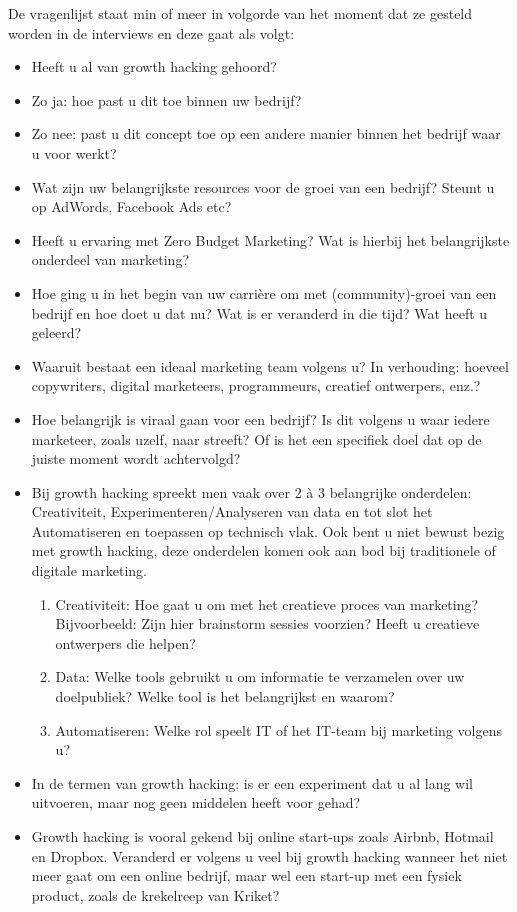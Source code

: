 De vragenlijst staat min of meer in volgorde van het moment dat ze gesteld worden in de interviews en deze gaat als volgt:
\begin{itemize} 
	\item Heeft u al van growth hacking gehoord?
	\item Zo ja: hoe past u dit toe binnen uw bedrijf?
	\item Zo nee: past u dit concept toe op een andere manier binnen het bedrijf waar u voor werkt?
	\item Wat zijn uw belangrijkste resources voor de groei van een bedrijf? Steunt u op AdWords, Facebook Ads etc?
	\item Heeft u ervaring met Zero Budget Marketing? Wat is hierbij het belangrijkste onderdeel van marketing?
	\item Hoe ging u in het begin van uw carrière om met (community)-groei van een bedrijf en hoe doet u dat nu? Wat is er veranderd in die tijd? Wat heeft u geleerd?
	\item Waaruit bestaat een ideaal marketing team volgens u? In verhouding: hoeveel copywriters, digital marketeers, programmeurs, creatief ontwerpers, enz.?
	\item Hoe belangrijk is viraal gaan voor een bedrijf? Is dit volgens u waar iedere marketeer, zoals uzelf, naar streeft? Of is het een specifiek doel dat op de juiste moment wordt achtervolgd?
	\item Bij growth hacking spreekt men vaak over 2 à 3 belangrijke onderdelen: Creativiteit, Experimenteren/Analyseren van data en tot slot het Automatiseren en toepassen op technisch vlak. Ook bent u niet bewust bezig met growth hacking, deze onderdelen komen ook aan bod bij traditionele of digitale marketing.
	\begin{enumerate}[label*=\arabic*.]
		\item Creativiteit: Hoe gaat u om met het creatieve proces van marketing? Bijvoorbeeld: Zijn hier brainstorm sessies voorzien? Heeft u creatieve ontwerpers die helpen?
		\item Data: Welke tools gebruikt u om informatie te verzamelen over uw doelpubliek? Welke tool is het belangrijkst en waarom?
		\item Automatiseren: Welke rol speelt IT of het IT-team bij marketing volgens u? 
	\end{enumerate}
	\item In de termen van growth hacking: is er een experiment dat u al lang wil uitvoeren, maar nog geen middelen heeft voor gehad?
	\item Growth hacking is vooral gekend bij online start-ups zoals Airbnb, Hotmail en Dropbox. Veranderd er volgens u veel bij growth hacking wanneer het niet meer gaat om een online bedrijf, maar wel een start-up met een fysiek product, zoals de krekelreep van Kriket?
\end{itemize}

